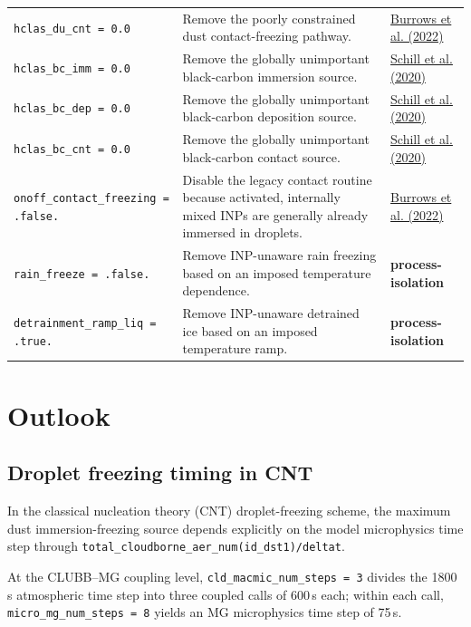 \begin{longtable}{@{}>{\raggedright\arraybackslash}p{}>{\raggedright\arraybackslash}p{}>{\raggedright\arraybackslash}p{}@{}}
\texttt{hclas\_du\_cnt = 0.0} & Remove the poorly constrained dust contact-freezing pathway. & \href{https://doi.org/10.1029/2021RG000745}{Burrows et al. (2022)} \\
\texttt{hclas\_bc\_imm = 0.0} & Remove the globally unimportant black-carbon immersion source. & \href{https://doi.org/10.1073/pnas.2001674117}{Schill et al. (2020)} \\
\texttt{hclas\_bc\_dep = 0.0} & Remove the globally unimportant black-carbon deposition source. & \href{https://doi.org/10.1073/pnas.2001674117}{Schill et al. (2020)} \\
\texttt{hclas\_bc\_cnt = 0.0} & Remove the globally unimportant black-carbon contact source. & \href{https://doi.org/10.1073/pnas.2001674117}{Schill et al. (2020)} \\
\texttt{onoff\_contact\_freezing = .false.} & Disable the legacy contact routine because activated, internally mixed INPs are generally already immersed in droplets. & \href{https://doi.org/10.1029/2021RG000745}{Burrows et al. (2022)} \\
\texttt{rain\_freeze = .false.} & Remove INP-unaware rain freezing based on an imposed temperature dependence. & \textbf{process-isolation} \\
\texttt{detrainment\_ramp\_liq = .true.} & Remove INP-unaware detrained ice based on an imposed temperature ramp. & \textbf{process-isolation} \\
\bottomrule
\end{longtable}

\section*{Outlook}

\subsection*{Droplet freezing timing in CNT}

In the classical nucleation theory (CNT) droplet-freezing scheme, the maximum dust immersion-freezing source depends explicitly on the model microphysics time step through \nolinkurl{total_cloudborne_aer_num(id_dst1)/deltat}.

At the CLUBB--MG coupling level, \texttt{cld\_macmic\_num\_steps = 3} divides the 1800\,s atmospheric time step into three coupled calls of 600\,s each; within each call, \texttt{micro\_mg\_num\_steps = 8} yields an MG microphysics time step of 75\,s.

